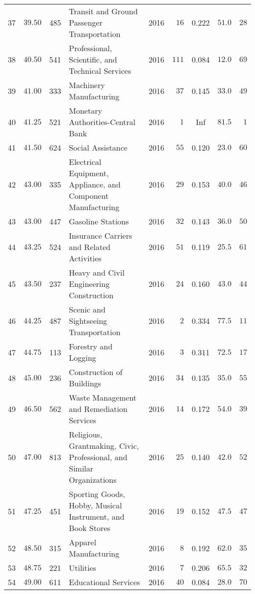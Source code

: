 \documentclass[9pt, oneside]{article}   	%
\begin{document}
\begin{longtable}{lccp{3in}ccccc}
37  & $39.50$ & 485 & Transit and Ground Passenger Transportation & 2016 & $\phantom{0}16$ & 0.222 & $51.0$ & $28$ \\
38  & $40.50$ & 541 & Professional, Scientific, and Technical Services & 2016 & $111$ & 0.084 & $12.0$ & $69$ \\
39  & $41.00$ & 333 & Machinery Manufacturing & 2016 & $\phantom{0}37$ & 0.145 & $33.0$ & $49$ \\
40  & $41.25$ & 521 & Monetary Authorities-Central Bank & 2016 & $\phantom{00}1$ &   Inf & $81.5$ & $\phantom{0}1$ \\
41  & $41.50$ & 624 & Social Assistance & 2016 & $\phantom{0}55$ & 0.120 & $23.0$ & $60$ \\
42  & $43.00$ & 335 & Electrical Equipment, Appliance, and Component Manufacturing & 2016 & $\phantom{0}29$ & 0.153 & $40.0$ & $46$ \\
43  & $43.00$ & 447 & Gasoline Stations & 2016 & $\phantom{0}32$ & 0.143 & $36.0$ & $50$ \\
44  & $43.25$ & 524 & Insurance Carriers and Related Activities & 2016 & $\phantom{0}51$ & 0.119 & $25.5$ & $61$ \\
45  & $43.50$ & 237 & Heavy and Civil Engineering Construction & 2016 & $\phantom{0}24$ & 0.160 & $43.0$ & $44$ \\
46  & $44.25$ & 487 & Scenic and Sightseeing Transportation & 2016 & $\phantom{00}2$ & 0.334 & $77.5$ & $11$ \\
47  & $44.75$ & 113 & Forestry and Logging & 2016 & $\phantom{00}3$ & 0.311 & $72.5$ & $17$ \\
48  & $45.00$ & 236 & Construction of Buildings & 2016 & $\phantom{0}34$ & 0.135 & $35.0$ & $55$ \\
49  & $46.50$ & 562 & Waste Management and Remediation Services & 2016 & $\phantom{0}14$ & 0.172 & $54.0$ & $39$ \\
50  & $47.00$ & 813 & Religious, Grantmaking, Civic, Professional, and Similar Organizations & 2016 & $\phantom{0}25$ & 0.140 & $42.0$ & $52$ \\
51  & $47.25$ & 451 & Sporting Goods, Hobby, Musical Instrument, and Book Stores & 2016 & $\phantom{0}19$ & 0.152 & $47.5$ & $47$ \\
52  & $48.50$ & 315 & Apparel Manufacturing & 2016 & $\phantom{00}8$ & 0.192 & $62.0$ & $35$ \\
53  & $48.75$ & 221 & Utilities & 2016 & $\phantom{00}7$ & 0.206 & $65.5$ & $32$ \\
54  & $49.00$ & 611 & Educational Services & 2016 & $\phantom{0}40$ & 0.084 & $28.0$ & $70$ \\

\end{longtable}
\end{document}
